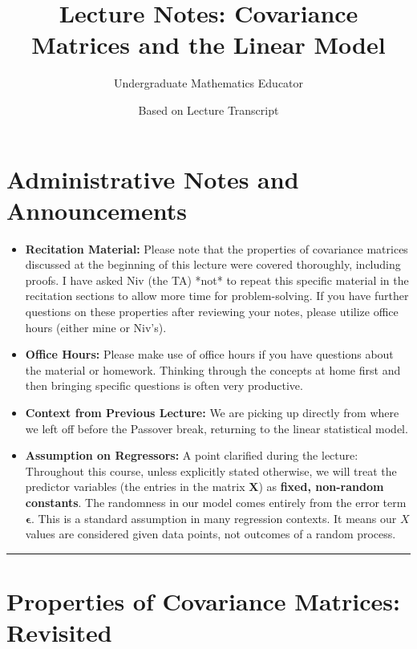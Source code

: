 \documentclass[11pt, letterpaper]{article}
\title{Lecture Notes: Covariance Matrices and the Linear Model}
\author{Undergraduate Mathematics Educator}
\date{Based on Lecture Transcript}
\theoremstyle{definition}
\newcommand{\mat}[1]{\mathbf{#1}} %
\newcommand{\vect}[1]{\boldsymbol{#1}} %
\begin{document}
\maketitle

\section*{Administrative Notes and Announcements}

\begin{itemize}
    \item \textbf{Recitation Material:} Please note that the properties of covariance matrices discussed at the beginning of this lecture were covered thoroughly, including proofs. I have asked Niv (the TA) *not* to repeat this specific material in the recitation sections to allow more time for problem-solving. If you have further questions on these properties after reviewing your notes, please utilize office hours (either mine or Niv's).
    \item \textbf{Office Hours:} Please make use of office hours if you have questions about the material or homework. Thinking through the concepts at home first and then bringing specific questions is often very productive.
    \item \textbf{Context from Previous Lecture:} We are picking up directly from where we left off before the Passover break, returning to the linear statistical model.
    \item \textbf{Assumption on Regressors:} A point clarified during the lecture: Throughout this course, unless explicitly stated otherwise, we will treat the predictor variables (the entries in the matrix $\mat{X}$) as \textbf{fixed, non-random constants}. The randomness in our model comes entirely from the error term $\vect{\epsilon}$. This is a standard assumption in many regression contexts. It means our $X$ values are considered given data points, not outcomes of a random process.
\end{itemize}
\vspace{1em}
\hrule
\vspace{1em}

\section{Properties of Covariance Matrices: Revisited}
\end{document}

